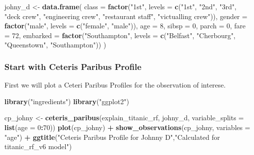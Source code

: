 \documentclass[12pt,]{krantz}
\newenvironment{Shaded}{\begin{snugshade}}{\end{snugshade}}
\newcommand{\DataTypeTok}[1]{\textcolor[rgb]{0.13,0.29,0.53}{#1}}
\newcommand{\DecValTok}[1]{\textcolor[rgb]{0.00,0.00,0.81}{#1}}
\newcommand{\KeywordTok}[1]{\textcolor[rgb]{0.13,0.29,0.53}{\textbf{#1}}}
\newcommand{\NormalTok}[1]{#1}
\newcommand{\OperatorTok}[1]{\textcolor[rgb]{0.81,0.36,0.00}{\textbf{#1}}}
\newcommand{\StringTok}[1]{\textcolor[rgb]{0.31,0.60,0.02}{#1}}
\theoremstyle{definition}
\theoremstyle{definition}
\theoremstyle{definition}
\theoremstyle{remark}
\begin{document}
\begin{Shaded}
\begin{Highlighting}[]
\NormalTok{johny_d <-}\StringTok{ }\KeywordTok{data.frame}\NormalTok{(}
  \DataTypeTok{class =} \KeywordTok{factor}\NormalTok{(}\StringTok{"1st"}\NormalTok{, }\DataTypeTok{levels =} \KeywordTok{c}\NormalTok{(}\StringTok{"1st"}\NormalTok{, }\StringTok{"2nd"}\NormalTok{, }\StringTok{"3rd"}\NormalTok{, }\StringTok{"deck crew"}\NormalTok{, }\StringTok{"engineering crew"}\NormalTok{, }
                                  \StringTok{"restaurant staff"}\NormalTok{, }\StringTok{"victualling crew"}\NormalTok{)),}
  \DataTypeTok{gender =} \KeywordTok{factor}\NormalTok{(}\StringTok{"male"}\NormalTok{, }\DataTypeTok{levels =} \KeywordTok{c}\NormalTok{(}\StringTok{"female"}\NormalTok{, }\StringTok{"male"}\NormalTok{)),}
  \DataTypeTok{age =} \DecValTok{8}\NormalTok{,}
  \DataTypeTok{sibsp =} \DecValTok{0}\NormalTok{,}
  \DataTypeTok{parch =} \DecValTok{0}\NormalTok{,}
  \DataTypeTok{fare =} \DecValTok{72}\NormalTok{,}
  \DataTypeTok{embarked =} \KeywordTok{factor}\NormalTok{(}\StringTok{"Southampton"}\NormalTok{, }\DataTypeTok{levels =} \KeywordTok{c}\NormalTok{(}\StringTok{"Belfast"}\NormalTok{, }\StringTok{"Cherbourg"}\NormalTok{, }\StringTok{"Queenstown"}\NormalTok{, }\StringTok{"Southampton"}\NormalTok{))}
\NormalTok{)}
\end{Highlighting}
\end{Shaded}

\hypertarget{start-with-ceteris-paribus-profile}{%
\subsubsection{Start with Ceteris Paribus
Profile}\label{start-with-ceteris-paribus-profile}}

First we will plot a Ceteri Paribus Profiles for the observation of
interese.

\begin{Shaded}
\begin{Highlighting}[]
\KeywordTok{library}\NormalTok{(}\StringTok{"ingredients"}\NormalTok{)}
\KeywordTok{library}\NormalTok{(}\StringTok{"ggplot2"}\NormalTok{)}

\NormalTok{cp_johny <-}\StringTok{ }\KeywordTok{ceteris_paribus}\NormalTok{(explain_titanic_rf, johny_d, }\DataTypeTok{variable_splits =} \KeywordTok{list}\NormalTok{(}\DataTypeTok{age =} \DecValTok{0}\OperatorTok{:}\DecValTok{70}\NormalTok{))}
\KeywordTok{plot}\NormalTok{(cp_johny) }\OperatorTok{+}
\StringTok{  }\KeywordTok{show_observations}\NormalTok{(cp_johny, }\DataTypeTok{variables =} \StringTok{"age"}\NormalTok{) }\OperatorTok{+}
\StringTok{  }\KeywordTok{ggtitle}\NormalTok{(}\StringTok{"Ceteris Paribus Profile for Johnny D"}\NormalTok{,}\StringTok{"Calculated for titanic_rf_v6 model"}\NormalTok{)}
\end{Highlighting}
\end{Shaded}
\end{document}
